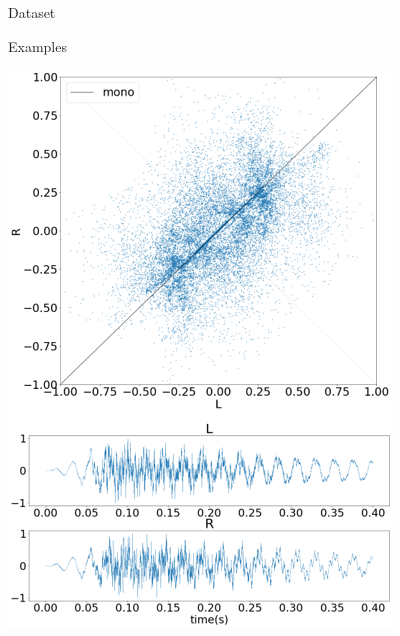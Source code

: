 \begin{frame}{Dataset}
\begin{block}{Examples}
\begin{minipage}{.24\textwidth}
        \includegraphics[width=0.9\linewidth]{Presentation/figures/dataset_example_2.png}
    \end{minipage}
    \begin{minipage}{.24\textwidth}
        \centering

\end{minipage}
\end{block}
\end{frame}
